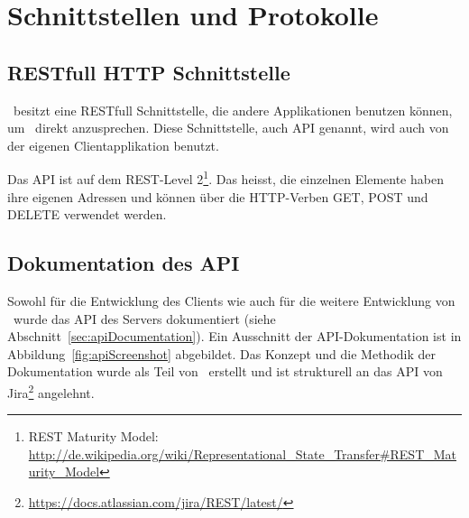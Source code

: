 \chapter{Schnittstellen und Protokolle}
	
\section{RESTfull HTTP Schnittstelle}

	\eeppi\ besitzt eine RESTfull Schnittstelle, die andere Applikationen benutzen können, um \eeppi\ direkt anzusprechen.
	Diese Schnittstelle, auch API genannt, wird auch von der eigenen Clientapplikation benutzt.

	Das API ist auf dem REST-Level 2\footnote{REST Maturity Model: \url{http://de.wikipedia.org/wiki/Representational\_State\_Transfer\#REST\_Maturity\_Model}}.
	Das heisst, die einzelnen Elemente haben ihre eigenen Adressen
	und können über die HTTP-Verben GET, POST und DELETE verwendet werden.
	
\section{Dokumentation des API}
	\label{sec:apiDokumentationCreation}
	Sowohl für die Entwicklung des Clients wie auch für die weitere Entwicklung von \eeppi\ wurde das API des Servers dokumentiert (siehe Abschnitt~\ref{sec:apiDocumentation}).
	Ein Ausschnitt der API-Dokumentation ist in Abbildung~\ref{fig:apiScreenshot} abgebildet.
	Das Konzept und die Methodik der Dokumentation wurde als Teil von \eeppi\ erstellt
	und ist strukturell an das API von Jira\footnote{\url{https://docs.atlassian.com/jira/REST/latest/}} angelehnt.
	
